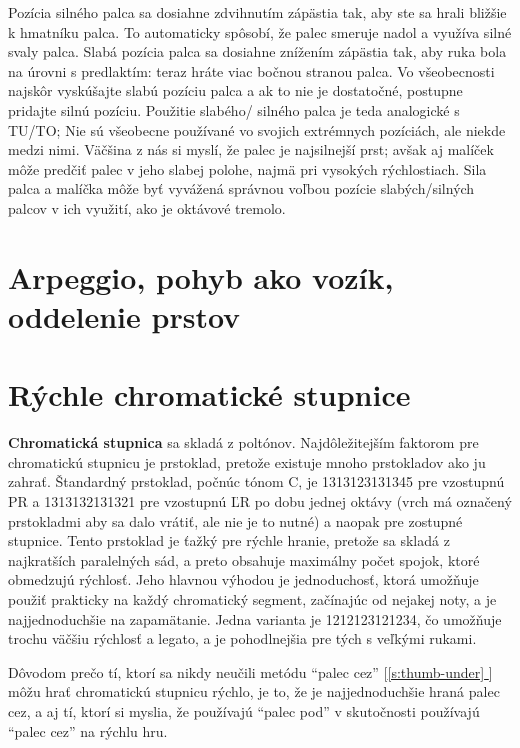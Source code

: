 \documentclass[11pt,a4paper]{book}
\newcommand*{\fullref}[1]{\hyperref[{#1}]{\ref*{#1} \nameref*{#1}}} %
\newcommand*{\fullrefp}[1]{[\fullref{#1}]} %
\begin{document}
Pozícia silného palca sa dosiahne zdvihnutím zápästia tak, aby ste sa hrali bližšie k hmatníku palca. To automaticky spôsobí, že palec smeruje nadol a využíva silné svaly palca. Slabá pozícia palca sa dosiahne znížením zápästia tak, aby ruka bola na úrovni s predlaktím: teraz hráte viac bočnou stranou palca. Vo všeobecnosti najskôr vyskúšajte slabú pozíciu palca a ak to nie je dostatočné, postupne pridajte silnú pozíciu. Použitie slabého/ silného palca je teda analogické s TU/TO; Nie sú všeobecne používané vo svojich extrémnych pozíciách, ale niekde medzi nimi. Väčšina z nás si myslí, že palec je najsilnejší prst; avšak aj malíček môže predčiť palec v jeho slabej polohe, najmä pri vysokých rýchlostiach. Sila palca a malíčka môže byť vyvážená správnou voľbou pozície slabých/silných palcov v ich  využití, ako je oktávové tremolo.

\section{Arpeggio, pohyb ako vozík, oddelenie prstov}\label{s:arpeggio}

\section{Rýchle chromatické stupnice}\label{s:fast-scales}
\textbf{Chromatická stupnica} sa skladá z poltónov. Najdôležitejším faktorom pre chromatickú stupnicu je prstoklad, pretože existuje mnoho prstokladov ako ju zahrať. Štandardný prstoklad, počnúc tónom C, je 1313123131345 pre vzostupnú PR a 1313132131321 pre vzostupnú ĽR po dobu jednej oktávy (vrch má označený prstokladmi aby sa dalo vrátiť, ale nie je to nutné) a naopak pre zostupné stupnice. Tento prstoklad je ťažký pre rýchle hranie, pretože sa skladá z najkratších paralelných sád, a preto obsahuje maximálny počet spojok, ktoré obmedzujú rýchlosť. Jeho hlavnou výhodou je jednoduchosť, ktorá umožňuje použiť prakticky na každý chromatický segment, začínajúc od nejakej noty, a je najjednoduchšie na zapamätanie. Jedna varianta je 1212123121234, čo umožňuje trochu väčšiu rýchlosť a legato, a je pohodlnejšia pre tých s veľkými rukami.

Dôvodom prečo tí, ktorí sa nikdy neučili metódu “palec cez” \fullrefp{s:thumb-under} môžu hrať chromatickú stupnicu rýchlo, je to, že je najjednoduchšie hraná palec cez, a aj tí, ktorí si myslia, že používajú “palec pod” v skutočnosti používajú “palec cez” na rýchlu hru.
\end{document}
